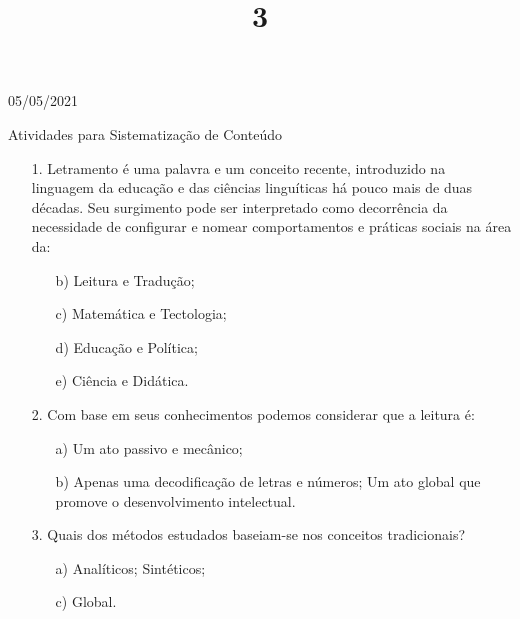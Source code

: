 \documentclass{SchoolBook}
\begin{document}
    \begin{day}{05/05/2021}
        \title{3}{Atividades para Sistematização de Conteúdo}
        
        \begin{enumerate}
            \item[1.] Letramento é uma palavra e um conceito recente, introduzido na linguagem da educação e das ciências linguíticas há pouco mais de duas décadas. Seu surgimento pode ser interpretado como decorrência da necessidade de configurar e nomear comportamentos e práticas sociais na área da:
            \begin{enumerate}[nosep]
                \itemc[a)] Leitura e Escrita;
                \item[b)] Leitura e Tradução;
                \item[c)] Matemática e Tectologia;
                \item[d)] Educação e Política;
                \item[e)] Ciência e Didática.
            \end{enumerate}
            
            \item[2.] Com base em seus conhecimentos podemos considerar que a leitura é:
            \begin{enumerate}[nosep]
                \item[a)] Um ato passivo e mecânico;
                \item[b)] Apenas uma decodificação de letras e números;
                \itemc[c)] Um ato global que promove o desenvolvimento intelectual.
            \end{enumerate}
            
            \item[3.] Quais dos métodos estudados baseiam-se nos conceitos tradicionais?
            \begin{enumerate}[nosep]
                \item[a)] Analíticos;
                \itemc[b)] Sintéticos;
                \item[c)] Global.
            \end{enumerate}
        \end{enumerate}
    \end{day}
    
\end{document}

